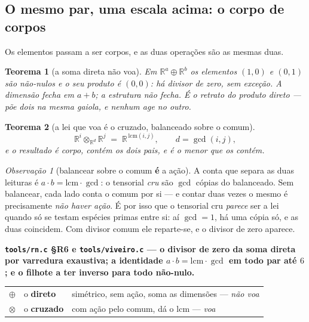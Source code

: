 \documentclass[11pt]{article}
\newcommand{\code}[1]{\texttt{\small #1}}
\newcommand{\R}{\mathbb R}
\theoremstyle{plain}
\newtheorem{teorema}{Teorema}
\theoremstyle{remark}
\newtheorem{obs}{Observação}
\providecommand{\medido}[1]{\textbf{#1}}
\begin{document}
\subsection{O mesmo par, uma escala acima: o corpo de corpos}

Os elementos passam a ser corpos, e as duas operações são as mesmas duas.

\begin{teorema}[a soma direta não voa]
Em $\R^a\oplus\R^b$ os elementos $(1,0)$ e $(0,1)$ são não-nulos e o seu produto é $(0,0)$: há
divisor de zero, sem exceção. \emph{A dimensão fecha em $a+b$; a estrutura não fecha.} É o retrato
do produto direto --- põe dois na mesma gaiola, e nenhum age no outro.
\end{teorema}

\begin{teorema}[a lei que voa é o cruzado, balanceado sobre o comum]
\[
 \R^i\otimes_{\R^d}\R^j \;=\; \R^{\,\mathrm{lcm}(i,j)},\qquad d=\gcd(i,j),
\]
e o resultado é corpo, contém os dois pais, e é o \emph{menor} que os contém.
\end{teorema}

\begin{obs}[balancear sobre o comum \textbf{é} a ação]
A conta que separa as duas leituras é $a\cdot b=\mathrm{lcm}\cdot\gcd$: o tensorial \emph{cru} são
$\gcd$ cópias do balanceado. Sem balancear, cada lado conta o comum por si --- e contar duas vezes o
mesmo é precisamente \emph{não haver ação}. É por isso que o tensorial cru \emph{parece} ser a lei
quando só se testam espécies primas entre si: aí $\gcd=1$, há uma cópia só, e as duas coincidem.
Com divisor comum ele reparte-se, e o divisor de zero aparece.
\end{obs}
\medido{\code{tools/rn.c} §R6 e \code{tools/viveiro.c} --- o divisor de zero da soma direta por
varredura exaustiva; a identidade $a\cdot b=\mathrm{lcm}\cdot\gcd$ em todo par até $6$; e o filhote
a ter inverso para todo não-nulo.}

\begin{center}
\begin{tabular}{lll}
\toprule
$\oplus$ & o \textbf{direto} & simétrico, sem ação, soma as dimensões --- \emph{não voa} \\
$\otimes$ & o \textbf{cruzado} & com ação pelo comum, dá o $\mathrm{lcm}$ --- \emph{voa} \\
\bottomrule
\end{tabular}
\end{center}
\end{document}
